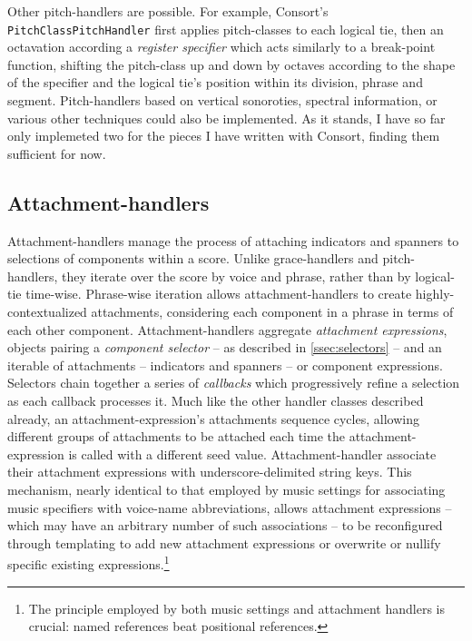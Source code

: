 \noindent Other pitch-handlers are possible. For example, Consort's
\texttt{PitchClassPitchHandler} first applies pitch-classes to each logical
tie, then an octavation according a \emph{register specifier} which acts
similarly to a break-point function, shifting the pitch-class up and down by
octaves according to the shape of the specifier and the logical tie's position
within its division, phrase and segment. Pitch-handlers based on vertical
sonoroties, spectral information, or various other techniques could also be
implemented. As it stands, I have so far only implemeted two for the pieces I
have written with Consort, finding them sufficient for now.

\subsection{Attachment-handlers}
\label{ssec:attachment-handlers}

Attachment-handlers manage the process of attaching indicators and spanners to
selections of components within a score. Unlike grace-handlers and
pitch-handlers, they iterate over the score by voice and phrase, rather than by
logical-tie time-wise. Phrase-wise iteration allows attachment-handlers to
create highly-contextualized attachments, considering each component in a
phrase in terms of each other component. Attachment-handlers aggregate
\emph{attachment expressions}, objects pairing a \emph{component selector} --
as described in \autoref{ssec:selectors} -- and an iterable of attachments --
indicators and spanners -- or component expressions. Selectors chain together a
series of \emph{callbacks} which progressively refine a selection as each
callback processes it. Much like the other handler classes described already,
an attachment-expression's attachments sequence cycles, allowing different
groups of attachments to be attached each time the attachment-expression is
called with a different seed value. Attachment-handler associate their
attachment expressions with underscore-delimited string keys. This mechanism,
nearly identical to that employed by music settings for associating music
specifiers with voice-name abbreviations, allows attachment expressions --
which may have an arbitrary number of such associations -- to be reconfigured
through templating to add new attachment expressions or overwrite or nullify
specific existing expressions.\footnote{The principle employed by both music
settings and attachment handlers is crucial: named references beat positional
references.}

